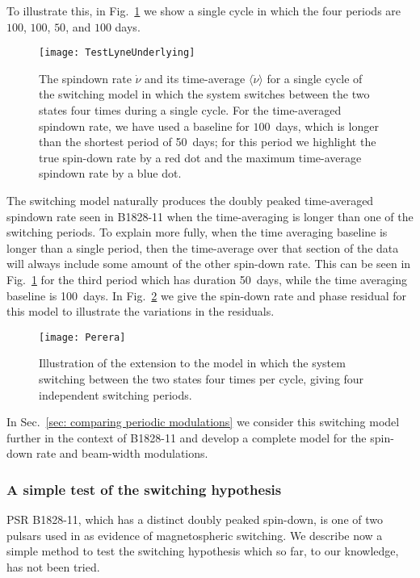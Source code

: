 To illustrate this, in Fig.~\ref{fig: test lyne underlying} we show a single
cycle in which the four periods are $100$, $100$, $50$, and $100$ days.
\begin{figure}[htb]
    \centering
    \texttt{[image: TestLyneUnderlying]}
    \caption{The spindown rate $\dot{\nu}$ and its time-average $\langle\dot{\nu}\rangle$
    for a single cycle of the \citet{Perera2014} switching model in which the
    system switches between the two states four times during a single cycle.
    For the time-averaged spindown rate, we have used a baseline for $100$~days,
    which is longer than the shortest period of 50~days; for this period we
    highlight the true spin-down rate by a red dot and the maximum time-average
    spindown rate by a blue dot.}
    \label{fig: test lyne underlying}
\end{figure}

The \citet{Perera2014} switching model naturally produces the doubly peaked
time-averaged spindown rate seen in B1828-11 when the time-averaging is longer
than one of the switching periods. To explain more fully, when the time
averaging baseline is longer than a single period, then the time-average over
that section of the data will always include some amount of the other spin-down
rate. This can be seen in Fig.~\ref{fig: test lyne underlying} for the third
period which has duration 50~days, while the time averaging baseline is
100~days. In Fig.~\ref{fig: perera example} we give the spin-down rate and
phase residual for this model to illustrate the variations in the residuals.
\begin{figure}[htb]
    \centering
    \texttt{[image: Perera]}
    \caption{Illustration of the \citet{Perera2014} extension to the
    \citet{Lyne2010} model in which the system switching between the two states
    four times per cycle, giving four independent switching periods.}
    \label{fig: perera example}
\end{figure}

In Sec.~\ref{sec: comparing periodic modulations} we consider this switching
model further in the context of B1828-11 and develop a complete model for the
spin-down rate and beam-width modulations.

\subsubsection{A simple test of the switching hypothesis}
PSR B1828-11, which has a distinct doubly peaked spin-down, is one of two pulsars
used in \citet{Lyne2010} as evidence of magnetospheric switching. We describe now
a simple method to test the switching hypothesis which so far, to our knowledge,
has not been tried.

